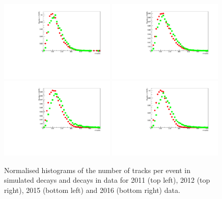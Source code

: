 \begin{figure}[ht]
  \centering
    \includegraphics[width=0.49\textwidth]{./Figs/LifetimeMeasurement/2011_nTracks_Bd2KPi_MC_data_comparison_Dec_triggers.pdf}
    \includegraphics[width=0.49\textwidth]{./Figs/LifetimeMeasurement/2012_nTracks_Bd2KPi_MC_data_comparison_Dec_triggers.pdf}
    \includegraphics[width=0.49\textwidth]{./Figs/LifetimeMeasurement/2015_nTracks_Bd2KPi_MC_data_comparison_Dec_triggers.pdf}
    \includegraphics[width=0.49\textwidth]{./Figs/LifetimeMeasurement/2016_nTracks_Bd2KPi_MC_data_comparison_Dec_triggers.pdf}
  \caption{Normalised histograms of the number of tracks per event in simulated \bdkpi decays and \bdkpi decays in data for 2011 (top left), 2012 (top right), 2015 (bottom left) and 2016 (bottom right) data. }
  \label{fig:nTracksMCDataComp}
\end{figure}
\FloatBarrier


